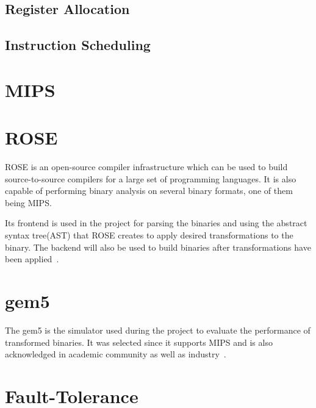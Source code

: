 \subsection{Register Allocation}


\subsection{Instruction Scheduling}


\section{MIPS}

\section{ROSE}
ROSE is an open-source compiler infrastructure which can be used to build
source-to-source compilers for a large set of programming languages.
It is also capable of performing binary analysis on several
binary formats, one of them being MIPS.
%

Its frontend is used in the project for parsing the binaries and using
the abstract syntax tree(AST) that ROSE creates to apply desired
transformations to the binary. The backend will also be used to build
binaries after transformations have been applied~\cite{rose}.

\section{gem5}
The gem5 is the simulator used during the project to evaluate the performance
of transformed binaries. It was selected since it supports MIPS and
is also acknowledged in academic community as well as industry~\cite{gem5}.

\section{Fault-Tolerance}

